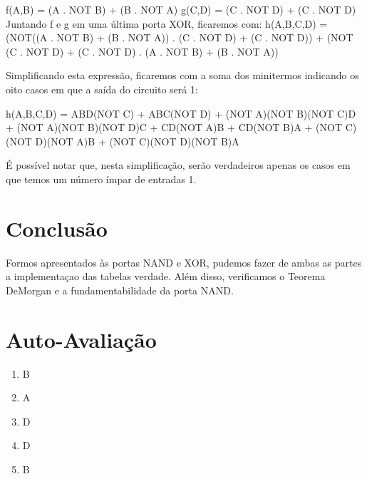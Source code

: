 \documentclass[12pt]{article}
\begin{document}
f(A,B) = (A . NOT B) + (B . NOT A)
g(C,D) = (C . NOT D) + (C . NOT D)
Juntando f e g em uma última porta XOR, ficaremos com:
h(A,B,C,D) = (NOT((A . NOT B) + (B . NOT A)) .  (C . NOT D) + (C . NOT D)) + (NOT  (C . NOT D) + (C . NOT D) .  (A . NOT B) + (B . NOT A))

Simplificando esta expressão, ficaremos com a soma dos minitermos indicando os oito casos em que a saída do circuito será 1:

h(A,B,C,D) = ABD(NOT C) + ABC(NOT D) + (NOT A)(NOT B)(NOT C)D + (NOT A)(NOT B)(NOT D)C + CD(NOT A)B + CD(NOT B)A + (NOT C)(NOT D)(NOT A)B + (NOT C)(NOT D)(NOT B)A

É possível notar que, nesta simplificação, serão verdadeiros apenas os casos em que temos um número ímpar de entradas 1.


\section{Conclusão}
\label{sec:Conclusao}

Formos apresentados às portas NAND e XOR, pudemos fazer de ambas as partes a implementaçao das tabelas verdade. Além disso, verificamos o Teorema DeMorgan e a fundamentabilidade da porta NAND.


\newpage 
\section*{Auto-Avaliação}

\begin{enumerate}
	\item B
	\item A
	\item D
	\item D
	\item B
\end{enumerate}
\end{document}
